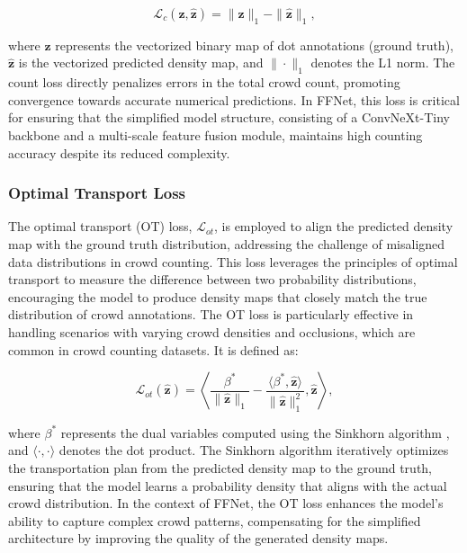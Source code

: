 \begin{equation}
\mathcal{L}_c(\mathbf{z}, \hat{\mathbf{z}}) = \|\mathbf{z}\|_1 - \|\hat{\mathbf{z}}\|_1,
\end{equation}

where $\mathbf{z}$ represents the vectorized binary map of dot annotations (ground truth), $\hat{\mathbf{z}}$ is the vectorized predicted density map, and $\|\cdot\|_1$ denotes the L1 norm. The count loss directly penalizes errors in the total crowd count, promoting convergence towards accurate numerical predictions. In FFNet, this loss is critical for ensuring that the simplified model structure, consisting of a ConvNeXt-Tiny backbone and a multi-scale feature fusion module, maintains high counting accuracy despite its reduced complexity.

\subsubsection{Optimal Transport Loss}
The optimal transport (OT) loss, $\mathcal{L}_{ot}$, is employed to align the predicted density map with the ground truth distribution, addressing the challenge of misaligned data distributions in crowd counting. This loss leverages the principles of optimal transport to measure the difference between two probability distributions, encouraging the model to produce density maps that closely match the true distribution of crowd annotations. The OT loss is particularly effective in handling scenarios with varying crowd densities and occlusions, which are common in crowd counting datasets. It is defined as:

\begin{equation}
\mathcal{L}_{ot}(\hat{\mathbf{z}}) = \left\langle \frac{\beta^*}{\|\hat{\mathbf{z}}\|_1} - \frac{\langle \beta^*, \hat{\mathbf{z}} \rangle}{\|\hat{\mathbf{z}}\|_1^2}, \hat{\mathbf{z}} \right\rangle,
\end{equation}

where $\beta^*$ represents the dual variables computed using the Sinkhorn algorithm \cite{peyre2019computational}, and $\langle \cdot, \cdot \rangle$ denotes the dot product. The Sinkhorn algorithm iteratively optimizes the transportation plan from the predicted density map to the ground truth, ensuring that the model learns a probability density that aligns with the actual crowd distribution. In the context of FFNet, the OT loss enhances the model's ability to capture complex crowd patterns, compensating for the simplified architecture by improving the quality of the generated density maps.

